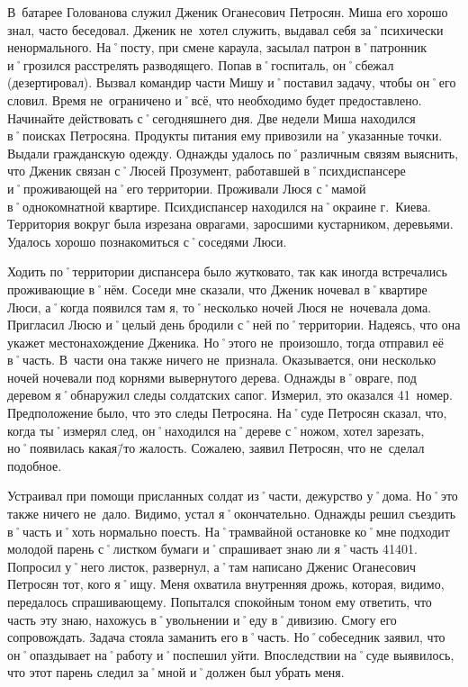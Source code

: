 В~батарее Голованова служил Дженик Оганесович Петросян. Миша его хорошо знал, часто беседовал. Дженик не~хотел служить, выдавал себя за˚психически ненормального. На˚посту, при смене караула, засылал патрон в˚патронник и˚грозился расстрелять разводящего. Попав в˚госпиталь, он˚сбежал (дезертировал). Вызвал командир части Мишу и˚поставил задачу, чтобы он˚его словил. Время не~ограничено и˚всё, что необходимо будет предоставлено. Начинайте действовать с˚сегодняшнего дня. Две недели Миша находился в˚поисках Петросяна. Продукты питания ему привозили на˚указанные точки. Выдали гражданскую одежду. Однажды удалось по˚различным связям выяснить, что Дженик связан с˚Люсей Прозумент, работавшей в˚психдиспансере и˚проживающей на˚его территории. Проживали Люся с˚мамой в˚однокомнатной квартире. Психдиспансер находился на˚окраине г.~Киева. Территория вокруг была изрезана оврагами, заросшими кустарником, деревьями. Удалось хорошо познакомиться с˚соседями Люси. 

Ходить по˚территории диспансера было жутковато, так как иногда встречались проживающие в˚нём. Соседи мне сказали, что Дженик ночевал в˚квартире Люси, а˚когда появился там я, то˚несколько ночей Люся не~ночевала дома. Пригласил Люсю и˚целый день бродили с˚ней по˚территории. Надеясь, что она укажет местонахождение Дженика. Но˚этого не~произошло, тогда отправил её в˚часть. В~части она также ничего не~признала. Оказывается, они несколько ночей ночевали под корнями вывернутого дерева. Однажды в˚овраге, под деревом я˚обнаружил следы солдатских сапог. Измерил, это оказался 41~номер. Предположение было, что это следы Петросяна. На˚суде Петросян сказал, что, когда ты˚измерял след, он˚находился на˚дереве с˚ножом, хотел зарезать, но˚появилась какая\=/то жалость. Сожалею, заявил Петросян, что не~сделал подобное. 

Устраивал при помощи присланных солдат из˚части, дежурство у˚дома. Но˚это также ничего не~дало. Видимо, устал я˚окончательно. Однажды решил съездить в˚часть и˚хоть нормально поесть. На˚трамвайной остановке ко˚мне подходит молодой парень с˚листком бумаги и˚спрашивает знаю ли я˚часть 41401. Попросил у˚него листок, развернул, а˚там написано Дженис Оганесович Петросян тот, кого я˚ищу. Меня охватила внутренняя дрожь, которая, видимо, передалось спрашивающему. Попытался спокойным тоном ему ответить, что часть эту знаю, нахожусь в˚увольнении и˚еду в˚дивизию. Смогу его сопровождать. Задача стояла заманить его в˚часть. Но˚собеседник заявил, что он˚опаздывает на˚работу и˚поспешил уйти. Впоследствии на˚суде выявилось, что этот парень следил за˚мной и˚должен был убрать меня. 

